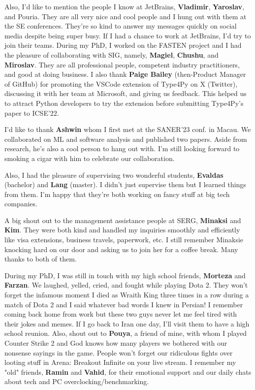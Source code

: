 Also, I'd like to mention the people I know at JetBrains, \textbf{Vladimir}, \textbf{Yaroslav}, and Pouria. They are all very nice and cool people and I hung out with them at the SE conferences. They're so kind to answer my messages quickly on social media despite being super busy. If I had a chance to work at JetBrains, I'd try to join their teams. During my PhD, I worked on the FASTEN project and I had the pleasure of collaborating with SIG, namely, \textbf{Magiel}, \textbf{Chushu}, and \textbf{Miroslav}. They are all professional people, competent industry practitioners, and good at doing business. I also thank \textbf{Paige Bailey} (then-Product Manager of GitHub) for promoting the VSCode extension of Type4Py on X (Twitter), discussing it with her team at Microsoft, and giving us feedback. This helped us to attract Python developers to try the extension before submitting Type4Py's paper to ICSE'22.

I'd like to thank \textbf{Ashwin} whom I first met at the SANER'23 conf. in Macau. We collaborated on ML and software analysis and published two papers. Aside from research, he's also a cool person to hang out with. I'm still looking forward to smoking a cigar with him to celebrate our collaboration. 

Also, I had the pleasure of supervising two wonderful students, \textbf{Evaldas} (bachelor) and \textbf{Lang} (master). I didn't just supervise them but I learned things from them. I'm happy that they're both working on fancy stuff at big tech companies.

A big shout out to the management assistance people at SERG, \textbf{Minaksi} and \textbf{Kim}. They were both kind and handled my inquiries smoothly and efficiently like visa extensions, business travels, paperwork, etc. I still remember Minaksie knocking hard on our door and asking us to join her for a coffee break. Many thanks to both of them.

During my PhD, I was still in touch with my high school friends, \textbf{Morteza} and \textbf{Farzan}. We laughed, yelled, cried, and fought while playing Dota 2. They won't forget the infamous moment I died as Wraith King three times in a row during a match of Dota 2 and I said whatever bad words I knew in Persian! I remember coming back home from work but these two guys never let me feel tired with their jokes and memes. If I go back to Iran one day, I'll visit them to have a high school reunion. Also, shout out to \textbf{Pouya}, a friend of mine, with whom I played Counter Strike 2 and God knows how many players we bothered with our nonsense sayings in the game. People won't forget our ridiculous fights over looting stuff in Arena: Breakout Infinite on your live stream. I remember my "old" friends, \textbf{Ramin} and \textbf{Vahid}, for their emotional support and our daily chats about tech and PC overclocking/benchmarking.

